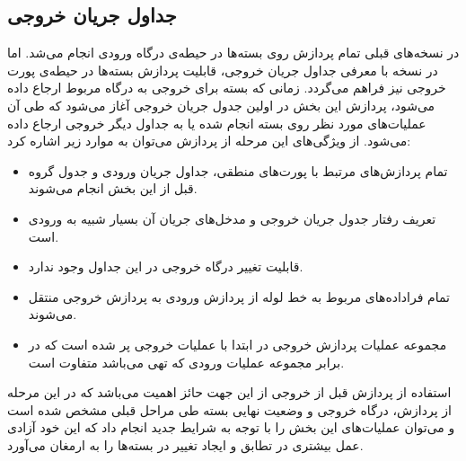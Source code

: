 \subsection{جداول جریان خروجی}
در نسخه‌های قبلی تمام پردازش روی بسته‌ها در حیطه‌ی درگاه ورودی انجام می‌شد. اما در نسخه  با معرفی جداول جریان خروجی، قابلیت پردازش بسته‌ها در حیطه‌ی پورت خروجی نیز فراهم می‌گردد. زمانی که بسته برای خروجی به درگاه مربوط ارجاع داده می‌شود، پردازش این بخش در اولین جدول جریان خروجی آغاز می‌شود که طی آن عملیات‌های مورد نظر روی بسته انجام شده یا به جداول دیگر خروجی ارجاع داده می‌شود. از ویژگی‌های این مرحله از پردازش می‌توان به موارد زیر اشاره کرد:
\begin{itemize}
	\item
تمام پردازش‌های مرتبط با پورت‌های منطقی، جداول جریان ورودی و جدول گروه قبل از این بخش انجام می‌شوند.
	\item
تعریف رفتار جدول جریان خروجی و مدخل‌های جریان آن بسیار شبیه به ورودی است.
	\item
قابلیت تغییر درگاه خروجی در این جداول وجود ندارد.
	\item
تمام فراداده‌های مربوط به خط لوله از پردازش  ورودی به پردازش خروجی منتقل می‌شوند.
	\item
مجموعه عملیات پردازش خروجی در ابتدا با عملیات خروجی پر شده است که در برابر مجموعه عملیات ورودی  که تهی می‌باشد متفاوت است.
\end{itemize}
استفاده از پردازش قبل از خروجی از این جهت حائز اهمیت می‌باشد که در این مرحله از پردازش، درگاه خروجی و وضعیت نهایی بسته طی مراحل قبلی مشخص شده است و می‌توان عملیات‌های این بخش را با توجه به شرایط جدید انجام داد که این خود آزادی عمل بیشتری در تطابق و ایجاد تغییر در بسته‌ها را به ارمغان می‌آورد.


